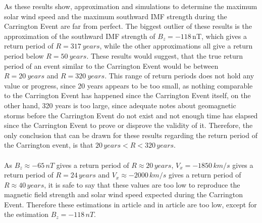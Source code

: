 \documentclass[12pt]{article}
\begin{document}
        As these results show, approximation and simulations to determine the maximum solar wind speed and the maximum southward IMF strength during the Carrington Event are far from perfect. The biggest outlier of these results is the approximation of the southward IMF strength of $B_z=-118\,$nT, which gives a return period of $R=317\ years$, while the other approximations all give a return period below $R=50\ years$. These results would suggest, that the true return period of an event similar to the Carrington Event would be between $R=20\ years$ and $R=320\ years$. This range of return periods does not hold any value or progress, since 20 years appears to be too small, as nothing comparable to the Carrington Event has happened since the Carrington Event itself, on the other hand, 320 years is too large, since adequate notes about geomagnetic storms before the Carrington Event do not exist and not enough time has elapsed since the Carrington Event to prove or disprove the validity of it. Therefore, the only conclusion that can be drawn for these results regarding the return period of the Carrington event, is that $20\, years < R < 320\, years$.\\ \\
        As $B_z\approx -65\, nT$ gives a return period of $R\approx20\, years$, $V_x=-1850\, km/s$ gives a return period of $R=24\, years$ and $V_x\approx -2000\, km/s$ gives a return period of $R\approx 40\, years$, it is safe to say that these values are too low to reproduce the magnetic field strength and solar wind speed expected during the Carrington Event. Therefore these estimations in article\cite{2013cliver} and in article\cite{2021blake} are too low, except for the estimation $B_z=-118\, nT$.
\end{document}
